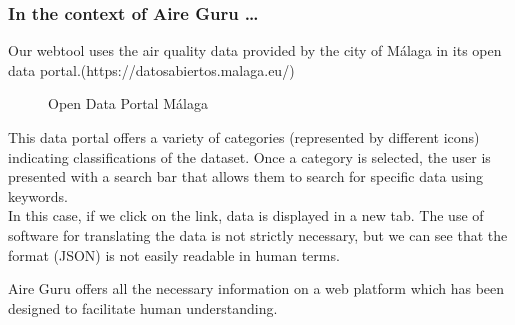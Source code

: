 \subsubsection*{In the context of Aire Guru \ldots} 

Our webtool uses the air quality data provided by the city of Málaga in its open data portal.(https://datosabiertos.malaga.eu/)\\

\begin{figure}[ht]
    \centering
    \hfill
    \vfill
    \caption{Open Data Portal Málaga}
\end{figure}

This data portal offers a variety of categories (represented by different icons) indicating classifications of the dataset.
Once a category is selected, the user is presented with a search bar that allows them to search for specific data using keywords.\\

In this case, if we click on the link, data is displayed in a new tab. The use of software
for translating the data is not strictly necessary, but we can see that the format (JSON) is not easily readable in human terms.

Aire Guru offers all the necessary information on a web platform which has been designed to facilitate human understanding.